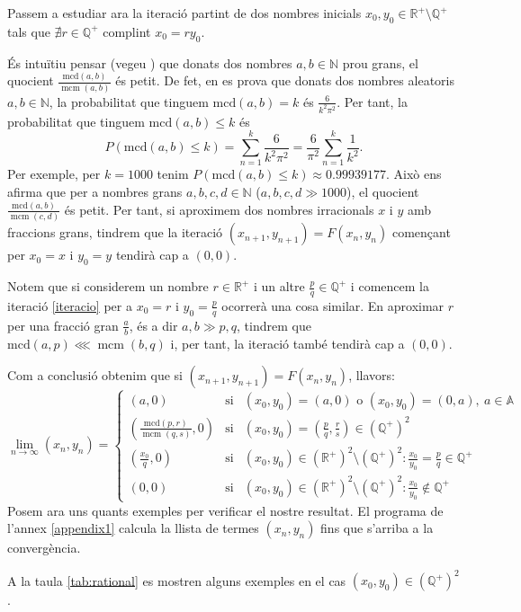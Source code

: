 \documentclass[11pt,a4paper]{article}
\theoremstyle{definition}
\newcommand{\NN}{\ensuremath{\mathbb{N}}}
\newcommand{\QQ}{\ensuremath{\mathbb{Q}}}
\newcommand{\RR}{\ensuremath{\mathbb{R}}}
\renewcommand{\gcd}{\text{mcd}}
\DeclareMathOperator{\lcm}{mcm}
\begin{document}
\begin{enumerate}
          Passem a estudiar ara la iteració partint de dos nombres inicials $x_0,y_0\in\RR^+\setminus\QQ^+$ tals que $\nexists r\in\QQ^+$ complint $x_0=ry_0$.\par
          És intuïtiu pensar (vegeu \cite{1}) que donats dos nombres $a,b\in\NN$ prou grans, el quocient $\frac{\gcd(a,b)}{\lcm(a,b)}$ és petit. De fet, en \cite{1} es prova que donats dos nombres aleatoris $a,b\in\NN$, la probabilitat que tinguem $\gcd(a,b)=k$ és $\frac{6}{k^2\pi^2}$. Per tant, la probabilitat que tinguem $\gcd(a,b)\leq k$ és $$P(\gcd(a,b)\leq k)=\sum_{n=1}^k\frac{6}{k^2\pi^2}=\frac{6}{\pi^2}\sum_{n=1}^k\frac{1}{k^2}.$$ Per exemple, per $k=1000$ tenim $P(\gcd(a,b)\leq k)\approx0.99939177$. Això ens afirma que per a nombres grans $a,b,c,d\in\NN$ ($a,b,c,d\gg1000$), el quocient $\frac{\gcd(a,b)}{\lcm(c,d)}$ és petit. Per tant, si aproximem dos nombres irracionals $x$ i $y$ amb fraccions grans, tindrem que la iteració $(x_{n+1},y_{n+1})=F(x_n,y_n)$ començant per $x_0=x$ i $y_0=y$ tendirà cap a $(0,0)$.\par
          Notem que si considerem un nombre $r\in\mathbb{R}^+$ i un altre $\frac{p}{q}\in\mathbb{Q}^+$ i comencem la iteració \eqref{iteracio} per a $x_0=r$ i $y_0=\frac{p}{q}$ ocorrerà una cosa similar. En aproximar $r$ per una fracció gran $\frac{a}{b}$, és a dir $a,b\gg p,q$, tindrem que $\gcd(a,p)\lll\lcm(b,q)$ i, per tant, la iteració també tendirà cap a $(0,0)$.
\end{enumerate}
Com a conclusió obtenim que si $(x_{n+1},y_{n+1})=F(x_n,y_n)$, llavors: $$\lim_{n\to\infty}(x_n,y_n)=\left\{\begin{array}{ccc}
        (a,0)                                      & \text{si} & (x_0,y_0)=(a,0) \text{ o }(x_0,y_0)=(0,a),\ a\in\mathbb{A}                  \\
        \left(\frac{\gcd(p,r)}{\lcm(q,s)},0\right) & \text{si} & (x_0,y_0)=\left(\frac{p}{q},\frac{r}{s}\right)\in(\QQ^+)^2                  \\
        \left(\frac{x_0}{q},0\right)               & \text{si} & (x_0,y_0)\in(\RR^+)^2\setminus(\QQ^+)^2:\frac{x_0}{y_0}=\frac{p}{q}\in\QQ^+ \\
        (0,0)                                      & \text{si} & (x_0,y_0)\in(\RR^+)^2\setminus(\QQ^+)^2:\frac{x_0}{y_0}\notin\QQ^+
    \end{array}\right.$$
Posem ara uns quants exemples per verificar el nostre resultat. El programa de l'annex \ref{appendix1} calcula la llista de termes $(x_n,y_n)$ fins que s'arriba a la convergència.\par A la taula \ref{tab:rational} es mostren alguns exemples en el cas $(x_0,y_0)\in(\QQ^+)^2$.\par
\end{document}
